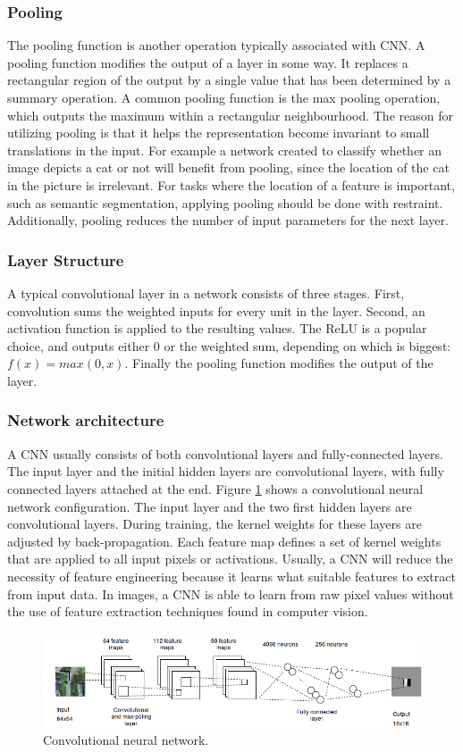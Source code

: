 \subsubsection{Pooling}
The pooling function is another operation typically associated with \ac{CNN}. A pooling function modifies the output of a layer in some way. It replaces a rectangular region of the output by a single value that has been determined by a summary operation. A common pooling function is the max pooling operation, which outputs the maximum within a rectangular neighbourhood. The reason for utilizing pooling is that it helps the representation become invariant to small translations in the input. For example a network created to classify whether an image depicts a cat or not will benefit from pooling, since the location of the cat in the picture is irrelevant. For tasks where the location of a feature is important, such as semantic segmentation, applying pooling should be done with restraint. Additionally, pooling reduces the number of input parameters for the next layer.

\subsubsection{Layer Structure}
A typical convolutional layer in a network consists of three stages. First, convolution sums the weighted inputs for every unit in the layer. Second, an activation function is applied to the resulting values. The \ac{ReLU} is a popular choice, and outputs either 0 or the weighted sum, depending on which is biggest: $f(x) = max(0, x)$. Finally the pooling function modifies the output of the layer. 

\subsubsection{Network architecture}
A \ac{CNN} usually consists of both convolutional layers and fully-connected layers. The input layer and the initial hidden layers are convolutional layers, with fully connected layers attached at the end. Figure \ref{fig:conv} shows a convolutional neural network configuration. The input layer and the two first hidden layers are convolutional layers. During training, the kernel weights for these layers are adjusted by back-propagation. Each feature map defines a set of kernel weights that are applied to all input pixels or activations. Usually, a \ac{CNN} will reduce the necessity of feature engineering because it learns what suitable features to extract from input data. In images, a \ac{CNN} is able to learn from raw pixel values without the use of feature extraction techniques found in computer vision.


\begin{figure}[t]
\begin{center}
\includegraphics[width=1\columnwidth]{figs/conv_diagram.png}
\caption[Convolutional neural network]{Convolutional neural network. }
\label{fig:conv}
\end{center}
\end{figure}